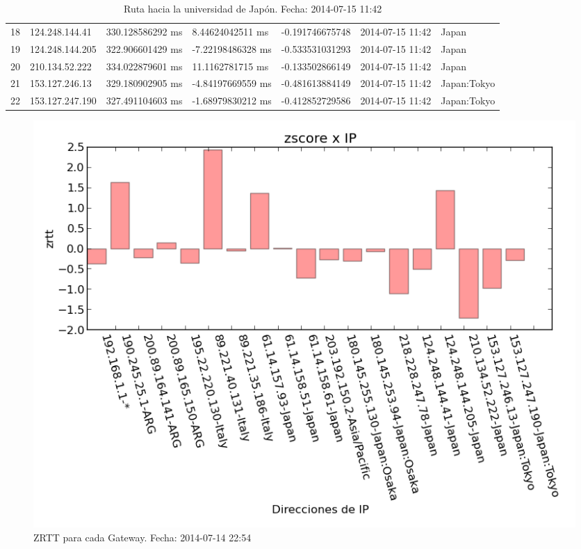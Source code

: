 \begin{table}[h]
{\begin{tabular}{lllllll}
18  & 124.248.144.41  & 330.128586292 ms & 8.44624042511 ms  & -0.191746675748  & 2014-07-15 11:42 & Japan               \\
19  & 124.248.144.205 & 322.906601429 ms & -7.22198486328 ms & -0.533531031293  & 2014-07-15 11:42 & Japan               \\
20  & 210.134.52.222  & 334.022879601 ms & 11.1162781715 ms  & -0.133502866149  & 2014-07-15 11:42 & Japan               \\
21  & 153.127.246.13  & 329.180902905 ms & -4.84197669559 ms & -0.481613884149  & 2014-07-15 11:42 & Japan:Tokyo         \\
22  & 153.127.247.190 & 327.491104603 ms & -1.68979830212 ms & -0.412852729586  & 2014-07-15 11:42 & Japan:Tokyo        
\end{tabular}
}
\caption{Ruta hacia la universidad de Japón. Fecha: 2014-07-15 11:42}
\label{my-label}
\end{table}

\begin{figure}[H]
	\begin{center}
		  \includegraphics[scale=0.5]{../graficos_informe/jsc_zscore.png}
		  \caption{ZRTT para cada Gateway. Fecha: 2014-07-14 22:54}
		  \label{fig:contra1}
	\end{center}
\end{figure}

